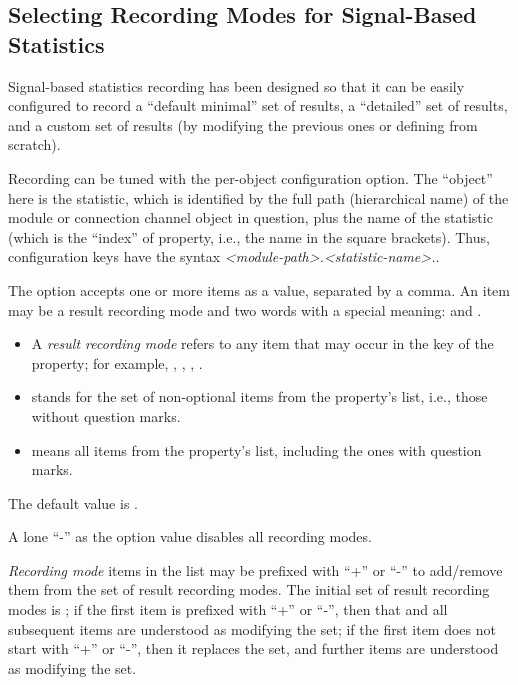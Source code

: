\subsection{Selecting Recording Modes for Signal-Based Statistics}
\label{sec:ana-sim:configuring-recording-modes}

Signal-based statistics recording has been designed so that it can be easily
configured to record a ``default minimal'' set of results, a ``detailed'' set of
results, and a custom set of results (by modifying the previous ones or defining
from scratch).

Recording can be tuned with the  per-object
configuration option. The ``object'' here is the statistic, which is identified by
the full path (hierarchical name) of the module or connection channel object in
question, plus the name of the statistic (which is the ``index'' of
 property, i.e., the name in the square brackets). Thus,
configuration keys have the syntax
\textit{<module-path>.<statistic-name>.}.

The  option accepts one or more items as a
value, separated by a comma. An item may be a result recording mode and two
words with a special meaning:  and .

\begin{itemize}
  \item A \textit{result recording mode} refers to any item that may occur in the
     key of the  property; for example, ,
    , , .
  \item {} stands for the set of non-optional items from the
     property's  list, i.e., those without question
    marks.
  \item {} means all items from the  property's
     list, including the ones with question marks.
\end{itemize}

The default value is .

A lone ``-'' as the option value disables all recording modes.

\textit{Recording mode} items in the list may be prefixed with ``+'' or
``-'' to add/remove them from the set of result recording modes. The
initial set of result recording modes is ; if the first item
is prefixed with ``+'' or ``-'', then that and all subsequent items are
understood as modifying the set; if the first item does not start with
``+'' or ``-'', then it replaces the set, and further items are understood
as modifying the set.

